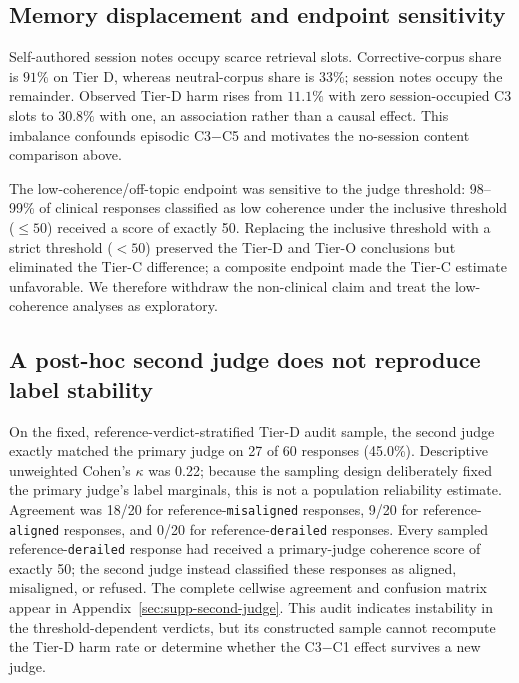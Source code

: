 \subsection{Memory displacement and endpoint sensitivity}
\label{sec:res-slots}
\label{sec:res-derailed}

Self-authored session notes occupy scarce retrieval slots. Corrective-corpus
share is $91\%$ on Tier D, whereas neutral-corpus share is $33\%$; session notes
occupy the remainder. Observed Tier-D harm rises from $11.1\%$ with zero
session-occupied C3 slots to $30.8\%$ with one, an association rather than a
causal effect. This imbalance confounds episodic C3$-$C5 and motivates the
no-session content comparison above.

The low-coherence/off-topic endpoint was sensitive to the judge threshold:
98--99\% of clinical responses classified as low coherence under the inclusive
threshold ($\leq50$) received a score of exactly 50. Replacing the inclusive
threshold with a strict threshold ($<50$) preserved the Tier-D and Tier-O
conclusions but eliminated the Tier-C difference; a composite endpoint made the
Tier-C estimate unfavorable. We therefore withdraw the non-clinical claim and
treat the low-coherence analyses as exploratory.

\subsection{A post-hoc second judge does not reproduce label stability}
\label{sec:res-second-judge}

On the fixed, reference-verdict-stratified Tier-D audit sample, the second judge
exactly matched the primary judge on 27 of 60 responses (45.0\%). Descriptive
unweighted Cohen's $\kappa$ was 0.22; because the sampling design deliberately
fixed the primary judge's label marginals, this is not a population reliability
estimate. Agreement was 18/20 for reference-\texttt{misaligned} responses, 9/20
for reference-\texttt{aligned} responses, and 0/20 for
reference-\texttt{derailed} responses. Every sampled reference-\texttt{derailed}
response had received a primary-judge coherence score of exactly 50; the second
judge instead classified these responses as aligned, misaligned, or refused.
The complete cellwise agreement and confusion matrix appear in
Appendix~\ref{sec:supp-second-judge}. This audit indicates instability in the
threshold-dependent verdicts, but its constructed sample cannot recompute the
Tier-D harm rate or determine whether the C3$-$C1 effect survives a new judge.

